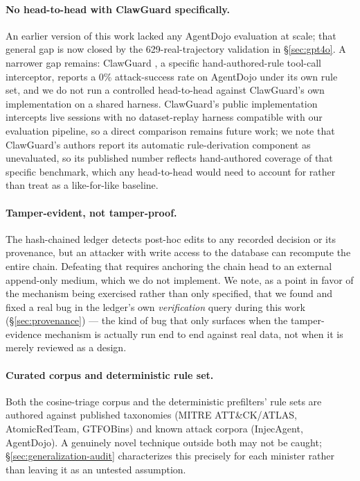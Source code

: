 \documentclass[sigconf,anonymous,review]{acmart}
\begin{document}
\paragraph{No head-to-head with ClawGuard specifically.} An earlier version of
this work lacked any AgentDojo evaluation at scale; that general gap is now
closed by the 629-real-trajectory validation in \S\ref{sec:gpt4o}. A
narrower gap remains: ClawGuard \cite{clawguard2026}, a specific
hand-authored-rule tool-call interceptor, reports a 0\% attack-success rate
on AgentDojo under its own rule set, and we do not run a controlled
head-to-head against ClawGuard's own implementation on a shared harness.
ClawGuard's public implementation intercepts live sessions with no
dataset-replay harness compatible with our evaluation pipeline, so a direct
comparison remains future work; we note that ClawGuard's authors report its
automatic rule-derivation component as unevaluated, so its published number
reflects hand-authored coverage of that specific benchmark, which any
head-to-head would need to account for rather than treat as a like-for-like
baseline.

\paragraph{Tamper-evident, not tamper-proof.} The hash-chained ledger detects
post-hoc edits to any recorded decision or its provenance, but an attacker
with write access to the database can recompute the entire chain. Defeating
that requires anchoring the chain head to an external append-only medium,
which we do not implement. We note, as a point in favor of the mechanism
being exercised rather than only specified, that we found and fixed a real
bug in the ledger's own \emph{verification} query during this work
(\S\ref{sec:provenance}) --- the kind of bug that only surfaces when the
tamper-evidence mechanism is actually run end to end against real data, not
when it is merely reviewed as a design.

\paragraph{Curated corpus and deterministic rule set.} Both the cosine-triage
corpus and the deterministic prefilters' rule sets are authored against
published taxonomies (MITRE ATT\&CK/ATLAS, AtomicRedTeam, GTFOBins) and known
attack corpora (InjecAgent, AgentDojo). A genuinely novel technique outside
both may not be caught; \S\ref{sec:generalization-audit} characterizes this
precisely for each minister rather than leaving it as an untested assumption.
\end{document}

